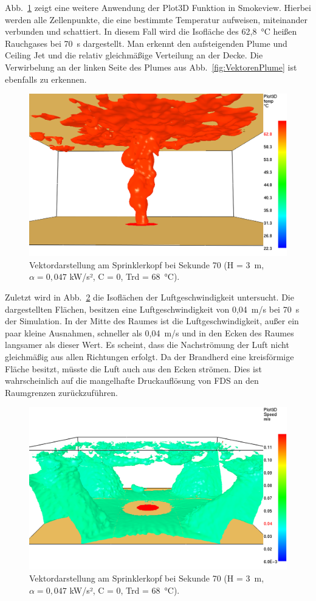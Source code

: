 \clearpage
\SuperPar
Abb.~\ref{fig:PlumeTemp} zeigt eine weitere Anwendung der Plot3D Funktion in Smokeview. Hierbei werden alle Zellenpunkte, die eine bestimmte Temperatur aufweisen, miteinander verbunden und schattiert. In diesem Fall wird die Isofläche des 62,8~°C heißen Rauchgases bei 70~s dargestellt. Man erkennt den aufsteigenden Plume und Ceiling Jet und die relativ gleichmäßige Verteilung an der Decke. Die Verwirbelung an der linken Seite des Plumes aus Abb.~\ref{fig:VektorenPlume} ist ebenfalls zu erkennen.
\begin{figure}[h]
    \centering
    \includegraphics[width=\textwidth]{images/FDSBilder/PlumeTemp.png}
    \caption{Vektordarstellung am Sprinklerkopf bei Sekunde 70 (H = 3~m, $\alpha=0,047$ kW/s², C = 0, Trd = 68~°C).}
    \label{fig:PlumeTemp}
\end{figure}
\clearpage
\SuperPar
Zuletzt wird in Abb.~\ref{fig:PlotEcken} die Isoflächen der Luftgeschwindigkeit untersucht. Die dargestellten Flächen, besitzen eine Luftgeschwindigkeit von 0,04~m/s bei 70~s der Simulation. In der Mitte des Raumes ist die Luftgeschwindigkeit, außer ein paar kleine Ausnahmen, schneller als 0,04~m/s und in den Ecken des Raumes langsamer als dieser Wert. Es scheint, dass die Nachströmung der Luft nicht gleichmäßig aus allen Richtungen erfolgt. Da der Brandherd eine kreisförmige Fläche besitzt, müsste die Luft auch aus den Ecken strömen. Dies ist wahrscheinlich auf die mangelhafte Druckauflösung von FDS an den Raumgrenzen zurückzuführen.

\begin{figure}[h]
    \centering
    \includegraphics[width=\textwidth]{images/FDSBilder/PlotEcken.png}
    \caption{Vektordarstellung am Sprinklerkopf bei Sekunde 70 (H = 3~m, $\alpha=0,047$ kW/s², C = 0, Trd = 68~°C).}
    \label{fig:PlotEcken}
\end{figure}
